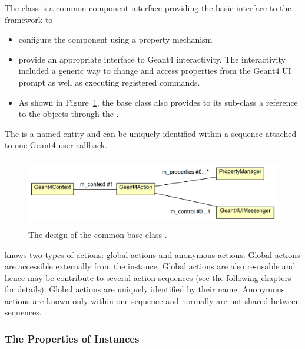 \documentclass[10pt,a4paper]{article}
\begin{document}
\noindent
The class  is a common component interface providing 
the basic interface to the framework to
\begin{itemize}\itemcompact
\item configure the component using a property mechanism
\item provide an appropriate interface to Geant4 interactivity. The interactivity 
    included a generic way to change and access properties from the Geant4 UI 
    prompt as well as executing registered commands.
\item As shown in Figure~\ref{fig:ddg4-implementation-geant4-action}, the 
    base class also provides to its sub-class a reference to the 
    objects through the .
\end{itemize}
The  is a named entity and can be uniquely identified within
a sequence attached to one Geant4 user callback.
\begin{figure}[h]
  \begin{center}
    \includegraphics[height=30mm] {DDG4-Geant4Action.png}
    \caption{The design of the common base class .}
    \label{fig:ddg4-implementation-geant4-action}
  \end{center}
\end{figure}

\noindent
\DDG knows two types of actions: global actions and anonymous actions.
Global actions are accessible externally from the  instance.
Global actions are also re-usable and hence may be contribute to several 
action sequences (see the following chapters for details). Global actions 
are uniquely identified by their name.
Anonymous actions are known only within one sequence and normally
are not shared between sequences.

\subsubsection{The Properties of  Instances}
\label{sec:ddg4-implementation-geant4-action-properties}
\end{document}
